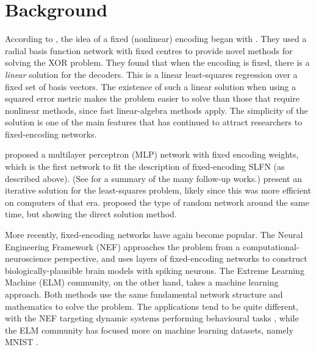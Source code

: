 

\section{Background}

According to \textcite{Wang2008},
the idea of a fixed (nonlinear) encoding began with \textcite{Broomhead1988}.
They used a radial basis function network with fixed centres
to provide novel methods for solving the XOR problem.
They found that when the encoding is fixed,
there is a \emph{linear} solution for the decoders.
This is a linear least-squares regression
over a fixed set of basis vectors.
The existence of such a linear solution when using a squared error metric
makes the problem easier to solve than those that require nonlinear methods,
since fast linear-algebra methods apply.
The simplicity of the solution is one of the main features
that has continued to attract researchers to fixed-encoding networks.

\textcite{Pao1989} proposed a multilayer perceptron (MLP) network
with fixed encoding weights,
which is the first network to fit the description of
fixed-encoding SLFN (as described above).
(See \textcite{Wang2008} for a summary of the many follow-up works.)
\textcite{Pao1992} present an iterative solution for the least-squares problem,
likely since this was more efficient on computers of that era.
\textcite{Schmidt1992} proposed the type of random network around the same time,
but showing the direct solution method.


More recently, fixed-encoding networks have again become popular.
The Neural Engineering Framework (NEF) \parencite{Eliasmith1999,Eliasmith2003}
approaches the problem from a computational-neuroscience perspective,
and uses layers of fixed-encoding networks
to construct biologically-plausible brain models with spiking neurons.
The Extreme Learning Machine (ELM) \parencite{Huang2006} community,
on the other hand, takes a machine learning approach.
Both methods use the same fundamental network structure
and mathematics to solve the problem.
The applications tend to be quite different,
with the NEF targeting dynamic systems performing behavioural tasks
\parencite[\eg/][]{Eliasmith2012},
while the ELM community has focused more on machine learning datasets,
namely MNIST \parencite[\eg/][]{McDonnell2015}.


